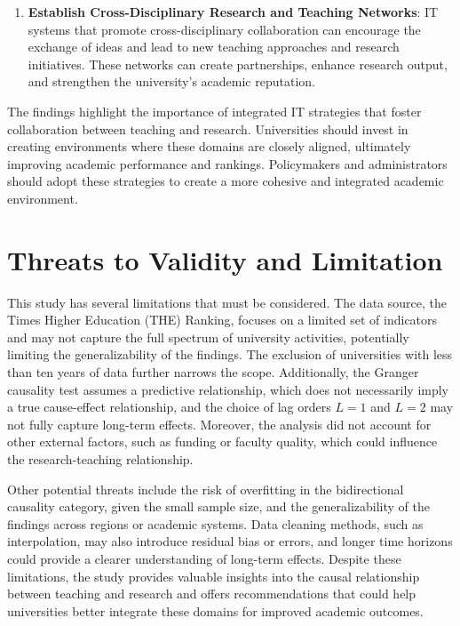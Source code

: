 \documentclass[a4paper, conference]{IEEEtran}
\begin{document}
\begin{enumerate}
	\item \textbf{Establish Cross-Disciplinary Research and Teaching Networks}: IT systems that promote cross-disciplinary collaboration can encourage the exchange of ideas and lead to new teaching approaches and research initiatives. These networks can create partnerships, enhance research output, and strengthen the university’s academic reputation.
\end{enumerate}

The findings highlight the importance of integrated IT strategies that foster collaboration between teaching and research. Universities should invest in creating environments where these domains are closely aligned, ultimately improving academic performance and rankings. Policymakers and administrators should adopt these strategies to create a more cohesive and integrated academic environment.



\section{Threats to Validity and Limitation}
\label{threads_to_validity_and_limitation}

This study has several limitations that must be considered. The data source, the Times Higher Education (THE) Ranking, focuses on a limited set of indicators and may not capture the full spectrum of university activities, potentially limiting the generalizability of the findings. The exclusion of universities with less than ten years of data further narrows the scope. Additionally, the Granger causality test assumes a predictive relationship, which does not necessarily imply a true cause-effect relationship, and the choice of lag orders $L=1$ and $L=2$ may not fully capture long-term effects. Moreover, the analysis did not account for other external factors, such as funding or faculty quality, which could influence the research-teaching relationship.

Other potential threats include the risk of overfitting in the bidirectional causality category, given the small sample size, and the generalizability of the findings across regions or academic systems. Data cleaning methods, such as interpolation, may also introduce residual bias or errors, and longer time horizons could provide a clearer understanding of long-term effects. Despite these limitations, the study provides valuable insights into the causal relationship between teaching and research and offers recommendations that could help universities better integrate these domains for improved academic outcomes.
\end{document}

